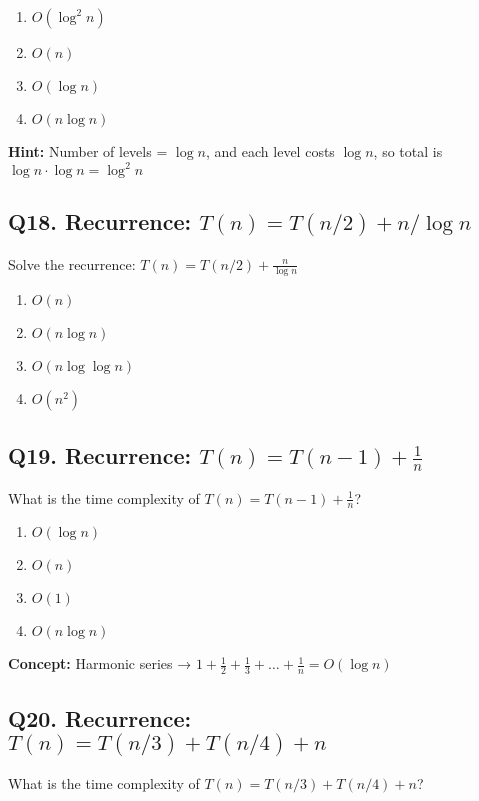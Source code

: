 \begin{enumerate}[label=(\alph*)]
    \item \(O(\log^2 n)\) \quad
    \item \(O(n)\) \quad
    \item \(O(\log n)\) \quad
    \item \(O(n \log n)\)
\end{enumerate}

\textbf{Hint:} Number of levels = \(\log n\), and each level costs \(\log n\), so total is \(\log n \cdot \log n = \log^2 n\)


\subsection*{Q18. Recurrence: \(T(n) = T(n/2) + n/\log n\)}
Solve the recurrence: \(T(n) = T(n/2) + \frac{n}{\log n}\)

\begin{enumerate}[label=(\alph*)]
    \item \(O(n)\) \quad
    \item \(O(n \log n)\) \quad
    \item \(O(n \log \log n)\) \quad
    \item \(O(n^2)\)
\end{enumerate}


\subsection*{Q19. Recurrence: \(T(n) = T(n-1) + \frac{1}{n}\)}
What is the time complexity of \(T(n) = T(n-1) + \frac{1}{n}\)?

\begin{enumerate}[label=(\alph*)]
    \item \(O(\log n)\) \quad
    \item \(O(n)\) \quad
    \item \(O(1)\) \quad
    \item \(O(n \log n)\)
\end{enumerate}

\textbf{Concept:} Harmonic series → \(1 + \frac{1}{2} + \frac{1}{3} + \dots + \frac{1}{n} = O(\log n)\)


\subsection*{Q20. Recurrence: \(T(n) = T(n/3) + T(n/4) + n\)}
What is the time complexity of \(T(n) = T(n/3) + T(n/4) + n\)?

